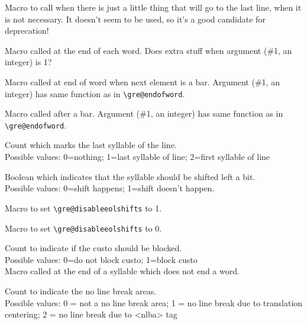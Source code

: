 Macro to call when there is just a little thing that will go to the
last line, when it is not necessary. It doesn't seem to be used, so
it's a good candidate for deprecation!

Macro called at the end of each word.  Does extra stuff when argument (\#1, an integer) is 1?

Macro called at end of word when next element is a bar.  Argument (\#1, an
integer) has same function as in \verb=\gre@endofword=.

Macro called after a bar.  Argument (\#1, an integer) has same function as
in \verb=\gre@endofword=.

Count which marks the last syllable of the line.\\
Possible values: 0=nothing; 1=last syllable of line; 2=first syllable of line

Boolean which indicates that the syllable should be shifted left a bit.\\
Possible values: 0=shift happens; 1=shift doesn't happen.

Macro to set \verb=\gre@disableeolshifts= to 1.

Macro to set \verb=\gre@disableeolshifts= to 0.

Count to indicate if the custo should be blocked.\\
Possible values: 0=do not block custo; 1=block custo\\

Macro called at the end of a syllable which does not end a word.

Count to indicate the no line break areas.\\
Possible values: 0 = not a no line break area; 1 = no line break due to translation centering; 2 = no line break due to <nlba> tag\\

